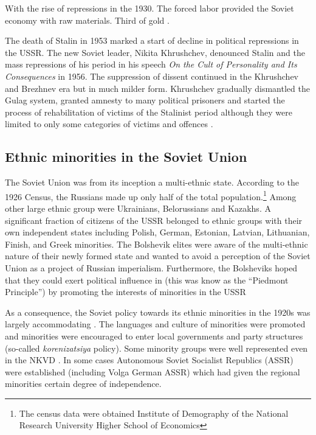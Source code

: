 With the rise of repressions in the 1930.
The forced labor provided the Soviet economy with raw materials. Third of gold \citep{applebaum_gulag:_2004}. 

The death of Stalin in 1953 marked a start of decline in political repressions in the USSR. The new Soviet leader, Nikita Khrushchev, denounced Stalin and the mass repressions of his period in his speech \emph{On the Cult of Personality and Its Consequences} in 1956. The suppression of dissent continued in the Khrushchev and  Brezhnev era but in much milder form. Khrushchev gradually dismantled the Gulag system, granted amnesty to many political prisoners and started the process of rehabilitation of victims of the Stalinist period although they were limited to only some categories of victims and offences \citep{applebaum_gulag:_2004, dobson_khrushchevs_2009}. 

\subsection{Ethnic minorities in the Soviet Union}
The Soviet Union was from its inception a multi-ethnic state. 
According to the 1926 Census, the Russians made up only half of the total population.\footnote{The census data were obtained  Institute of Demography of the National Research University Higher School of Economics} Among other large ethnic group were Ukrainians, Belorussians and Kazakhs.  A significant fraction of citizens of the USSR belonged to ethnic groups with their own independent states including Polish, German, Estonian, Latvian, Lithuanian, Finish,  and Greek minorities. 
The Bolshevik elites were aware of the multi-ethnic nature of their newly formed state and wanted to  avoid a perception of the Soviet Union as a project of Russian imperialism. Furthermore, the Bolsheviks hoped that
they could exert political influence in (this was know as the \enquote{Piedmont Principle})
by promoting the interests of minorities in the USSR

As a consequence, the Soviet policy towards its ethnic minorities in the 1920s was largely accommodating \citep{martin_affirmative_2001}. The languages and culture of minorities were promoted and minorities were encouraged to enter local governments and party structures (so-called \emph{korenizatsiya} policy). Some minority groups were well represented even in the NKVD \citep[p. 25]{gregory_terror_2009}.
In some cases Autonomous Soviet Socialist Republics (ASSR) were established (including Volga German ASSR) which had given the regional minorities certain degree of independence. 

